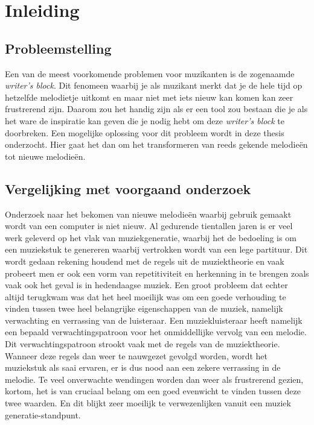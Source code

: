 \chapter{Inleiding}
\label{hoofdstuk:I}


\section{Probleemstelling}
Een van de meest voorkomende problemen voor muzikanten is de zogenaamde \textit{writer's block}. Dit fenomeen waarbij je als muzikant merkt dat je de hele tijd op hetzelfde melodietje uitkomt en maar niet met iets nieuw kan komen kan zeer frustrerend zijn. Daarom zou het handig zijn als er een tool zou bestaan die je als het ware de inspiratie kan geven die je nodig hebt om deze \textit{writer's block} te doorbreken. Een mogelijke oplossing voor dit probleem wordt in deze thesis onderzocht. Hier gaat het dan om het transformeren van reeds gekende melodie\"en tot nieuwe melodie\"en.

\section{Vergelijking met voorgaand onderzoek}
Onderzoek naar het bekomen van nieuwe melodie\"en waarbij gebruik gemaakt wordt van een computer is niet nieuw. Al gedurende tientallen jaren is er veel werk geleverd op het vlak van muziekgeneratie, waarbij het de bedoeling is om een muziekstuk te genereren waarbij vertrokken wordt van een lege partituur. Dit wordt gedaan rekening houdend met de regels uit de muziektheorie en vaak probeert men er ook een vorm van repetitiviteit en herkenning in te brengen zoals vaak ook het geval is in hedendaagse muziek. Een groot probleem dat echter altijd terugkwam was dat het heel moeilijk was om een goede verhouding te vinden tussen twee heel belangrijke eigenschappen van de muziek, namelijk verwachting en verrassing van de luisteraar. Een muziekluisteraar heeft namelijk een bepaald verwachtingspatroon voor het onmiddellijke vervolg van een melodie. Dit verwachtingspatroon strookt vaak met de regels van de muziektheorie. Wanneer deze regels dan weer te nauwgezet gevolgd worden, wordt het muziekstuk als saai ervaren, er is dus nood aan een zekere verrassing in de melodie. Te veel onverwachte wendingen worden dan weer als frustrerend gezien, kortom, het is van cruciaal belang om een goed evenwicht te vinden tussen deze twee waarden. En dit blijkt zeer moeilijk te verwezenlijken vanuit een muziek generatie-standpunt.\\

